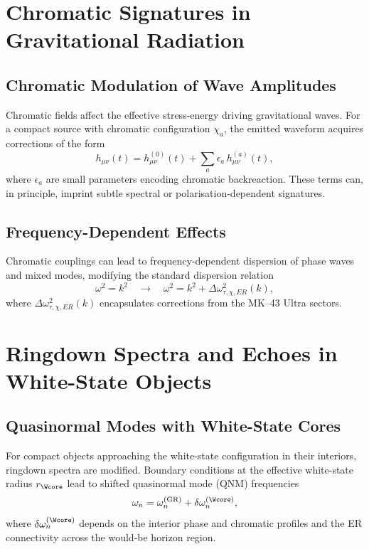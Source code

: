 \chapter{Chromatic Signatures in Gravitational Radiation}

\section{Chromatic Modulation of Wave Amplitudes}

Chromatic fields affect the effective stress-energy driving gravitational waves.
For a compact source with chromatic configuration $\chi_a$, the emitted waveform acquires corrections of the form
\[
h_{\mu\nu}(t)
=
h^{(0)}_{\mu\nu}(t)
+
\sum_a \epsilon_a\, h^{(a)}_{\mu\nu}(t),
\]
where $\epsilon_a$ are small parameters encoding chromatic backreaction.
These terms can, in principle, imprint subtle spectral or polarisation-dependent signatures.

\section{Frequency-Dependent Effects}

Chromatic couplings can lead to frequency-dependent dispersion of phase waves and mixed modes, modifying the standard dispersion relation
\[
\omega^2 = k^2 \quad \longrightarrow \quad
\omega^2 = k^2 + \Delta\omega^2_{\tau,\chi,ER}(k),
\]
where $\Delta\omega^2_{\tau,\chi,ER}(k)$ encapsulates corrections from the MK--43 Ultra sectors.

\chapter{Ringdown Spectra and Echoes in White-State Objects}

\section{Quasinormal Modes with White-State Cores}

For compact objects approaching the white-state configuration in their interiors, ringdown spectra are modified.
Boundary conditions at the effective white-state radius $r_{\Wcore}$ lead to shifted quasinormal mode (QNM) frequencies
\[
\omega_n = \omega_n^{\mathrm{(GR)}} + \delta\omega_n^{(\Wcore)},
\]
where $\delta\omega_n^{(\Wcore)}$ depends on the interior phase and chromatic profiles and the ER connectivity across the would-be horizon region.

